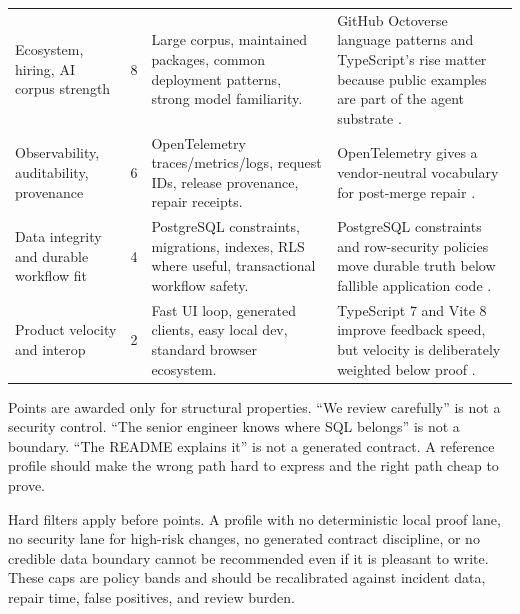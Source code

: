 \begin{table}[t]
\begin{tabularx}{\textwidth}{L{0.21\textwidth} R{0.07\textwidth} Y Y}
Ecosystem, hiring, AI corpus strength & 8 & Large corpus, maintained packages, common deployment patterns, strong model familiarity. & GitHub Octoverse language patterns and TypeScript's rise matter because public examples are part of the agent substrate \cite{githubOctoverse2025}. \\
Observability, auditability, provenance & 6 & OpenTelemetry traces/metrics/logs, request IDs, release provenance, repair receipts. & OpenTelemetry gives a vendor-neutral vocabulary for post-merge repair \cite{openTelemetryDocs2025,otelSemanticConventions2026}. \\
Data integrity and durable workflow fit & 4 & PostgreSQL constraints, migrations, indexes, RLS where useful, transactional workflow safety. & PostgreSQL constraints and row-security policies move durable truth below fallible application code \cite{postgresConstraints2026,postgresRowSecurity2026}. \\
Product velocity and interop & 2 & Fast UI loop, generated clients, easy local dev, standard browser ecosystem. & TypeScript 7 and Vite 8 improve feedback speed, but velocity is deliberately weighted below proof \cite{typescript70Beta2026,vite80Release2026}. \\
\bottomrule
\end{tabularx}
\end{table}

Points are awarded only for structural properties. ``We review carefully'' is not a security control. ``The senior engineer knows where SQL belongs'' is not a boundary. ``The README explains it'' is not a generated contract. A reference profile should make the wrong path hard to express and the right path cheap to prove.

Hard filters apply before points. A profile with no deterministic local proof lane, no security lane for high-risk changes, no generated contract discipline, or no credible data boundary cannot be recommended even if it is pleasant to write. These caps are policy bands and should be recalibrated against incident data, repair time, false positives, and review burden.

